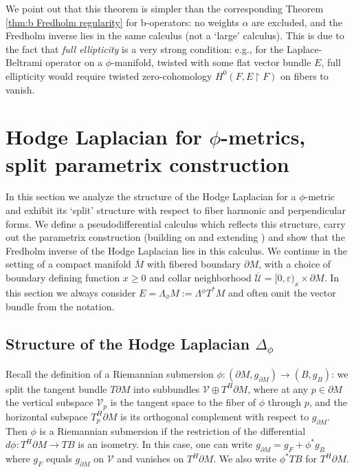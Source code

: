\documentclass[11pt]{article}
\newcommand{\eg}{e.g.,\xspace}
\numberwithin{equation}{section}
\theoremstyle{plain}
\theoremstyle{definition}
\newcommand{\Umath}{{\mathscr{U}}}
\newcommand\calV{{\mathcal V}}
\newcommand{\dM}{{\partial M}}
\newcommand{\Mbar}{{\overline{M}}}\let\M\Mbar
\let\eps\varepsilon
\begin{document}
We point out that this theorem is simpler than the corresponding Theorem \ref{thm:b Fredholm regularity} for b-operators: no weights $\alpha$ are excluded, and the Fredholm inverse lies in the same calculus (not a `large' calculus).
This is due to the fact that \emph{full ellipticity} is a very strong condition: \eg for the Laplace-Beltrami operator on a $\phi$-manifold, twisted with some flat vector bundle $E$, full ellipticity would require
twisted zero-cohomology $H^0(F,E\restriction F)$ on fibers to vanish.

\section{Hodge Laplacian for \texorpdfstring{$\phi$}{phi}-metrics, split parametrix construction}\label{sec:split}
In this section we analyze the structure of the Hodge Laplacian for a $\phi$-metric and exhibit its `split' structure with respect to fiber harmonic and perpendicular forms.
We define a pseudodifferential calculus which reflects this structure, carry out the parametrix construction (building on and extending \cite{grieser-para}) and show that the Fredholm inverse of the Hodge Laplacian lies in this calculus. We continue in the setting
of a compact manifold $\Mbar$ with fibered boundary $\partial M$, with a choice of boundary defining function $x \geq 0$ and collar neighborhood $\overline{\Umath}=[0,\eps)_x\times\dM$. In this section we always consider
$E= \Lambda_\phi M:=\Lambda {}^\phi T^*M$ and often omit the vector bundle from the notation.

\subsection{Structure of the Hodge Laplacian \texorpdfstring{$\Delta_{\phi}$}{Delta}}\label{subsec:str hodge}
Recall the definition of a Riemannian submersion $\phi: (\partial M, g_\dM)
\to (B, g_B)$: we split the tangent bundle $T\partial M$
into subbundles $\calV\oplus T^H \partial M$, where at any $p\in \partial M$
the vertical subspace $\calV_p$ is the tangent
space to the fiber of $\phi$ through $p$, and the horizontal subspace $T^H_p \partial M$ is its orthogonal complement with respect to $g_\dM$.
Then $\phi$ is a Riemannian submersion if the restriction of the differential $d\phi:T^H\dM \to TB$ is an isometry. In this case, one can write $g_\dM=g_F + \phi^*g_B$ where $g_{F}$ equals $g_{\dM}$ on $\calV$ and vanishes on $T^H \partial M$.
We also write $\phi^*TB$ for $T^H \partial M$.
\end{document}
